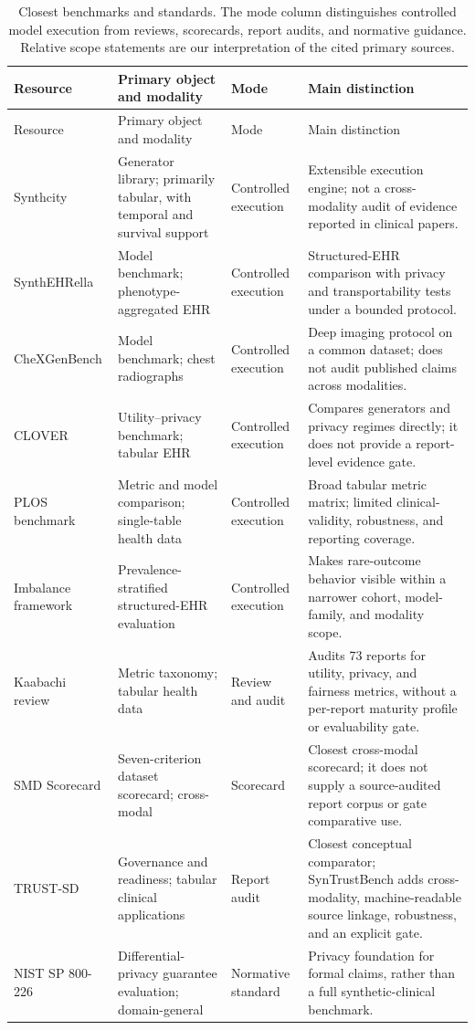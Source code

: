 \documentclass[11pt,letterpaper]{article}
\begin{document}
\begingroup
\small
\setlength{\tabcolsep}{3.5pt}
\begin{longtable}{P{2.2cm}P{3.5cm}P{2.1cm}P{6.5cm}}
\caption{Closest benchmarks and standards. The mode column distinguishes controlled model execution from reviews, scorecards, report audits, and normative guidance. Relative scope statements are our interpretation of the cited primary sources.}\label{tab:comparators}\\
\toprule
Resource & Primary object and modality & Mode & Main distinction \\
\midrule
\endfirsthead
\toprule
Resource & Primary object and modality & Mode & Main distinction \\
\midrule
\endhead
Synthcity \citep{qian2023synthcity} & Generator library; primarily tabular, with temporal and survival support & Controlled execution & Extensible execution engine; not a cross-modality audit of evidence reported in clinical papers. \\
SynthEHRella \citep{chen2025synthehrella} & Model benchmark; phenotype-aggregated EHR & Controlled execution & Structured-EHR comparison with privacy and transportability tests under a bounded protocol. \\
CheXGen\allowbreak Bench \citep{dutt2026chexgenbench} & Model benchmark; chest radiographs & Controlled execution & Deep imaging protocol on a common dataset; does not audit published claims across modalities. \\
CLOVER \citep{qi2026clover} & Utility--privacy benchmark; tabular EHR & Controlled execution & Compares generators and privacy regimes directly; it does not provide a report-level evidence gate. \\
PLOS benchmark \citep{nanevski2026quality} & Metric and model comparison; single-table health data & Controlled execution & Broad tabular metric matrix; limited clinical-validity, robustness, and reporting coverage. \\
Imbalance framework \citep{kim2026imbalanced} & Prevalence-stratified structured-EHR evaluation & Controlled execution & Makes rare-outcome behavior visible within a narrower cohort, model-family, and modality scope. \\
Kaabachi review \citep{kaabachi2025privacyutility} & Metric taxonomy; tabular health data & Review and audit & Audits 73 reports for utility, privacy, and fairness metrics, without a per-report maturity profile or evaluability gate. \\
SMD Scorecard \citep{zamzmi2025scorecard} & Seven-criterion dataset scorecard; cross-modal & Scorecard & Closest cross-modal scorecard; it does not supply a source-audited report corpus or gate comparative use. \\
TRUST-SD \citep{castagno2026trustsd} & Governance and readiness; tabular clinical applications & Report audit & Closest conceptual comparator; SynTrustBench adds cross-modality, machine-readable source linkage, robustness, and an explicit gate. \\
NIST SP 800-226 \citep{near2025nist} & Differential-privacy guarantee evaluation; domain-general & Normative standard & Privacy foundation for formal claims, rather than a full synthetic-clinical benchmark. \\
\bottomrule
\end{longtable}
\end{document}
